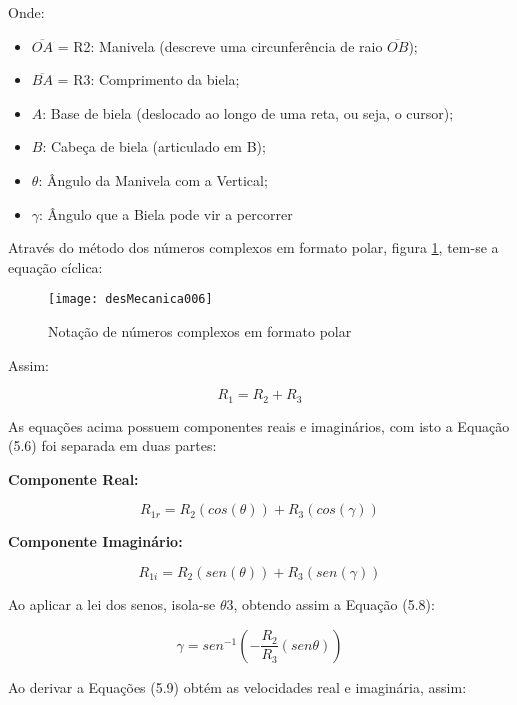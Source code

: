 		Onde:
		\begin{itemize}
			\item $ \overline{OA} $ = R2: Manivela (descreve uma circunferência de raio $ \overline{OB} $);
			\item $ \overline{BA} $ = R3: Comprimento da biela; 
			\item $A$: Base de biela (deslocado ao longo de uma reta, ou seja, o cursor);
			\item $B$: Cabeça de biela (articulado em B);
			\item $\theta$: Ângulo da Manivela com a Vertical;
			\item $\gamma$: Ângulo que a Biela pode vir a percorrer
		\end{itemize}

		Através do método dos números complexos em formato polar, figura \ref{desMecanica006}, tem-se a equação cíclica:

		\begin{figure}[h]
			\centering
			\texttt{[image: desMecanica006]}
			\caption{Notação de números complexos em formato polar}
			\label{desMecanica006}
		\end{figure}

		Assim:

		\begin{equation}
			R_{1} = R_{2} + R_{3}
		\end{equation}

		As equações acima possuem componentes reais e imaginários, com isto a Equação (5.6) foi separada em duas partes: 

		\textbf{Componente Real:}

		\begin{equation}
			R_{1r} = R_{2}(cos(\theta)) + R_{3}(cos(\gamma))
		\end{equation}

		\textbf{Componente Imaginário:}

		\begin{equation}
			R_{1i} = R_{2}(sen(\theta)) + R_{3}(sen(\gamma))
		\end{equation}

		Ao aplicar a lei dos senos, isola-se $\theta{3}$, obtendo assim a Equação (5.8):

		\begin{equation}
			\gamma = sen^{-1} ( - \frac{R_{2}}{R_{3}}(sen\theta))
		\end{equation}

		Ao derivar a Equações (5.9) obtém as velocidades real e imaginária, assim:

